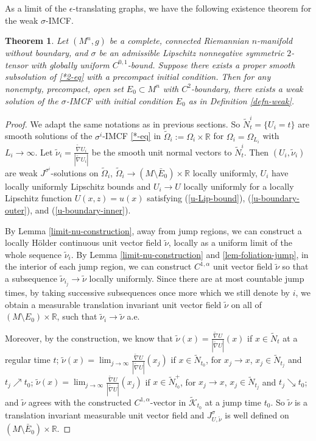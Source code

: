 \documentclass[11pt, letterpaper]{amsart}
\newtheorem{thm}{Theorem}[section]
\theoremstyle{definition}
\theoremstyle{remark}
\begin{document}
As a limit of the $\epsilon $-translating graphs, we have the following existence theorem for the weak $\sigma $-IMCF. 
\begin{thm}\label{sgm-IMCF-existence}
	Let $(M^n, g)$ be a complete, connected Riemannian $n$-manifold without boundary, and $\sigma $ be an admissible Lipschitz nonnegative symmetric $2$-tensor with globally uniform $C^{0,1}$-bound. Suppose there exists a proper smooth subsolution of \ref{*2-eq} with a precompact initial condition. Then for any nonempty, precompact, open set $E_0 \subset M^n$ with $C^2$-boundary, there exists a weak solution of the $\sigma $-IMCF with initial condition $E_0$ as in Definition \ref{defn-weak}.
\end{thm}

\begin{proof}
	We adapt the same notations as in previous sections. So  $\tilde{N}^{i}_t = \{ U_i = t\} $ are smooth solutions of the $\sigma^{i} $-IMCF \ref{*-eq} in $\tilde{\Omega }_i:= \Omega _i \times \mathbb{R}$ for $\Omega _i = \Omega _{L_i}$ with $L_i \to \infty$. Let $\tilde{\nu }_i = \frac{\tilde{\nabla }U_i}{|\tilde{\nabla }U_i|}$ be the smooth unit normal vectors to $\tilde{N}^{i}_t$. Then $(U_i, \tilde{\nu }_i)$ are weak $J ^{\sigma ^{i}}$-solutions on $\tilde{\Omega }_i$, $\tilde{\Omega }_i \to (M \setminus \bar{E}_0 ) \times \mathbb{R}$ locally uniformly, $U_i$ have locally uniformly Lipschitz bounds and $U_i \to U$ locally uniformly for a locally Lipschitz function $U(x,z)= u(x)$ satisfying (\ref{u-Lip-bound}), (\ref{u-boundary-outer}), and (\ref{u-boundary-inner}).

	By Lemma \ref{limit-nu-construction}, away from jump regions, we can construct a locally H\"older continuous unit vector field $\tilde{\nu }$, locally as a uniform limit of the whole sequence $\tilde{\nu }_i$. By Lemma \ref{limit-nu-construction} and \ref{lem-foliation-jump}, in the interior of each jump region, we can construct $C^{1,\alpha }$ unit vector field $\tilde{\nu }$ so that a subsequence $\tilde{\nu }_{i_j} \to \tilde{\nu }$ locally uniformly. Since there are at most countable jump times, by taking successive subsequences once more which we still denote by $i$, we obtain a measurable translation invariant unit vector field $\tilde{\nu }$ on all of $(M\setminus E_0) \times \mathbb{R}$, such that $\tilde{\nu }_i \to \tilde{\nu }$ a.e.

	Moreover, by the construction, we know that $\tilde{\nu }(x) = \frac{\tilde{\nabla }U}{|\tilde{\nabla }U|}(x)$ if $x \in \tilde{N}_t$ at a regular time $t$; $\tilde{\nu }(x) = \lim_{j\to \infty} \frac{\tilde{\nabla }U}{|\tilde{\nabla }U|}(x_j) $ if $x \in \tilde{N}_{t_0}$,  for $x_j \to x$, $x_j \in \tilde{N}_{t_j}$ and $t_j \nearrow t_0$; $\tilde{\nu }(x) = \lim_{j\to \infty}  \frac{\tilde{\nabla }U}{|\tilde{\nabla }U|}(x_j) $ if $x \in \tilde{N}_{t_0} ^{+}$,  for $x_j \to x$, $x_j \in \tilde{N}_{t_j}$ and $t_j \searrow t_0$; and $\tilde{\nu }$ agrees with the constructed $C^{1,\alpha }$-vector in $\tilde{\mathcal{K}}_{t_0}$ at a jump time $t_0$. So $\tilde{\nu }$ is a translation invariant measurable unit vector field and $J^{\sigma }_{U, \tilde{\nu }}$ is well defined on $(M \setminus \bar{E}_0) \times \mathbb{R}$. 


\end{proof}
\end{document}
